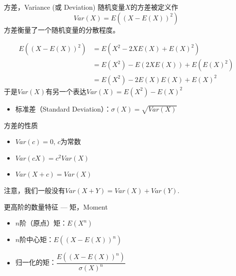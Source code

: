 \begin{frame}

\begin{block}{方差，Variance (或 Deviation)}
随机变量$X$的方差被定义作
\[Var(X) = E((X-E(X))^2)\]
方差衡量了一个随机变量的分散程度。
\end{block}\pause
\begin{align*}
E((X-E(X))^2) & = E(X^2 - 2XE(X) + E(X)^2) \\
& = E(X^2) - E(2XE(X)) + E(E(X)^2) \\
& = E(X^2) - 2E(X)E(X) + E(X)^2
\end{align*}
于是$Var(X)$有另一个表达$Var(X) = E(X^2) - E(X)^2$

\pause

\begin{itemize}
\item 标准差（Standard Deviation）：$\sigma(X) = \sqrt{Var(X)}$
\end{itemize}

\end{frame}


\begin{frame}

\begin{block}{方差的性质}
\begin{itemize}
\item $Var(c) = 0$, $c$为常数
\item $Var(cX) = c^2 Var(X)$
\item $Var(X+c) = Var(X)$
\end{itemize}

\vspace{1em}
\pause

注意，我们一般{\color{red}没有}$Var(X+Y) = Var(X) + Var(Y).$
\end{block}

\vspace{1em}
\pause

\begin{block}{更高阶的数量特征 --- 矩，Moment}
\begin{itemize}
\item $n$阶（原点）矩：$E(X^n)$
\item $n$阶中心矩：$E((X - E(X))^n)$
\pause
\item 归一化的矩：$\dfrac{E((X - E(X))^n)}{\sigma(X)^n}$
\end{itemize}
\end{block}

\end{frame}

